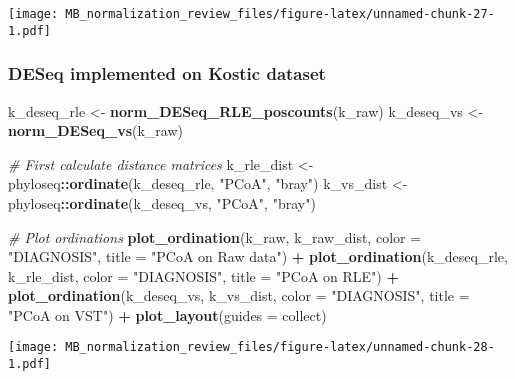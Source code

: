 \documentclass[
]{book}
\newenvironment{Shaded}{\begin{snugshade}}{\end{snugshade}}
\newcommand{\CommentTok}[1]{\textcolor[rgb]{0.56,0.35,0.01}{\textit{#1}}}
\newcommand{\DataTypeTok}[1]{\textcolor[rgb]{0.13,0.29,0.53}{#1}}
\newcommand{\KeywordTok}[1]{\textcolor[rgb]{0.13,0.29,0.53}{\textbf{#1}}}
\newcommand{\NormalTok}[1]{#1}
\newcommand{\OperatorTok}[1]{\textcolor[rgb]{0.81,0.36,0.00}{\textbf{#1}}}
\newcommand{\StringTok}[1]{\textcolor[rgb]{0.31,0.60,0.02}{#1}}
\begin{document}
\texttt{[image: MB\_normalization\_review\_files/figure-latex/unnamed-chunk-27-1.pdf]}

\hypertarget{deseq-implemented-on-kostic-dataset}{%
\subsubsection{DESeq implemented on Kostic dataset}\label{deseq-implemented-on-kostic-dataset}}

\begin{Shaded}
\begin{Highlighting}[]
\NormalTok{k\_deseq\_rle \textless{}{-}}\StringTok{ }\KeywordTok{norm\_DESeq\_RLE\_poscounts}\NormalTok{(k\_raw)}
\NormalTok{k\_deseq\_vs \textless{}{-}}\StringTok{ }\KeywordTok{norm\_DESeq\_vs}\NormalTok{(k\_raw)}

\CommentTok{\# First calculate distance matrices }
\NormalTok{k\_rle\_dist \textless{}{-}}\StringTok{ }\NormalTok{phyloseq}\OperatorTok{::}\KeywordTok{ordinate}\NormalTok{(k\_deseq\_rle, }\StringTok{"PCoA"}\NormalTok{, }\StringTok{"bray"}\NormalTok{) }
\NormalTok{k\_vs\_dist \textless{}{-}}\StringTok{ }\NormalTok{phyloseq}\OperatorTok{::}\KeywordTok{ordinate}\NormalTok{(k\_deseq\_vs, }\StringTok{"PCoA"}\NormalTok{, }\StringTok{"bray"}\NormalTok{) }

\CommentTok{\# Plot ordinations}
\KeywordTok{plot\_ordination}\NormalTok{(k\_raw, k\_raw\_dist, }\DataTypeTok{color =} \StringTok{"DIAGNOSIS"}\NormalTok{, }\DataTypeTok{title =} \StringTok{"PCoA on Raw data"}\NormalTok{) }\OperatorTok{+}\StringTok{ }
\KeywordTok{plot\_ordination}\NormalTok{(k\_deseq\_rle, k\_rle\_dist, }\DataTypeTok{color =} \StringTok{"DIAGNOSIS"}\NormalTok{, }\DataTypeTok{title =} \StringTok{"PCoA on RLE"}\NormalTok{) }\OperatorTok{+}
\KeywordTok{plot\_ordination}\NormalTok{(k\_deseq\_vs, k\_vs\_dist, }\DataTypeTok{color =} \StringTok{"DIAGNOSIS"}\NormalTok{, }\DataTypeTok{title =} \StringTok{"PCoA on VST"}\NormalTok{) }\OperatorTok{+}\StringTok{ }
\StringTok{  }\KeywordTok{plot\_layout}\NormalTok{(}\DataTypeTok{guides =} \StringTok{\textquotesingle{}collect\textquotesingle{}}\NormalTok{)}
\end{Highlighting}
\end{Shaded}

\texttt{[image: MB\_normalization\_review\_files/figure-latex/unnamed-chunk-28-1.pdf]}
\end{document}
